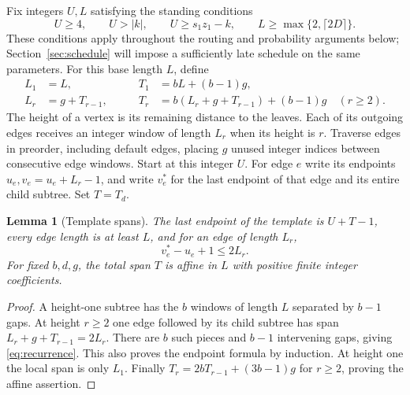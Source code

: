 \documentclass[11pt]{article}
\newtheorem{lemma}[theorem]{Lemma}
\theoremstyle{definition}
\theoremstyle{remark}
\begin{document}
Fix integers $U,L$ satisfying the standing conditions
\[
 U\geq4,\qquad U>|k|,\qquad U\geq s_1z_1-k,\qquad
 L\geq\max\{2,\lceil2D\rceil\}.
\]
These conditions apply throughout the routing and probability arguments below;
Section~\ref{sec:schedule} will impose a sufficiently late schedule on the same
parameters. For this base length $L$, define
\begin{equation}\label{eq:recurrence}
\begin{aligned}
 L_1&=L,\qquad & T_1&=bL+(b-1)g,\\
 L_r&=g+T_{r-1},\qquad &
 T_r&=b(L_r+g+T_{r-1})+(b-1)g\quad(r\geq2).
\end{aligned}
\end{equation}
The height of a vertex is its remaining distance to the leaves. Each of its
outgoing edges receives an integer window of length $L_r$ when its height is
$r$. Traverse edges in preorder, including default edges, placing $g$ unused
integer indices between consecutive edge windows. Start at this integer $U$.
For edge $e$ write its endpoints $u_e,v_e=u_e+L_r-1$, and write $v_e^*$ for
the last endpoint of that edge and its entire child subtree. Set $T=T_d$.

\begin{lemma}[Template spans]\label{lem:template}
The last endpoint of the template is $U+T-1$, every edge length is at least
$L$, and for an edge of length $L_r$,
\begin{equation}\label{eq:localspan}
 v_e^*-u_e+1\leq2L_r.
\end{equation}
For fixed $b,d,g$, the total span $T$ is affine in $L$ with positive finite
integer coefficients.
\end{lemma}
\begin{proof}
A height-one subtree has the $b$ windows of length $L$ separated by $b-1$
gaps. At height $r\geq2$ one edge followed by its child subtree has span
$L_r+g+T_{r-1}=2L_r$. There are $b$ such pieces and $b-1$ intervening gaps,
giving \eqref{eq:recurrence}. This also proves the endpoint formula by induction.
At height one the local span is only $L_1$. Finally
$T_r=2bT_{r-1}+(3b-1)g$ for $r\geq2$, proving the affine assertion.
\end{proof}
\end{document}
